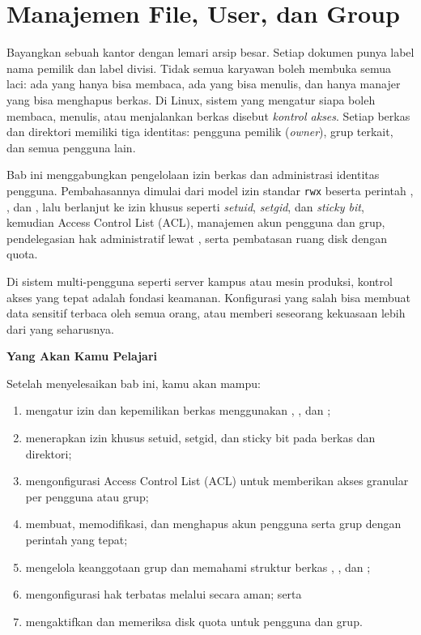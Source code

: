 
\chapter{Manajemen File, User, dan Group}
\label{ch:file-and-user-management}

Bayangkan sebuah kantor dengan lemari arsip besar. Setiap dokumen punya label nama pemilik dan label divisi. Tidak semua karyawan boleh membuka semua laci: ada yang hanya bisa membaca, ada yang bisa menulis, dan hanya manajer yang bisa menghapus berkas. Di Linux, sistem yang mengatur siapa boleh membaca, menulis, atau menjalankan berkas disebut \textit{kontrol akses}. Setiap berkas dan direktori memiliki tiga identitas: pengguna pemilik (\textit{owner}), grup terkait, dan semua pengguna lain.

Bab ini menggabungkan pengelolaan izin berkas dan administrasi identitas pengguna. Pembahasannya dimulai dari model izin standar \texttt{rwx} beserta perintah , , dan , lalu berlanjut ke izin khusus seperti \textit{setuid}, \textit{setgid}, dan \textit{sticky bit}, kemudian Access Control List (ACL), manajemen akun pengguna dan grup, pendelegasian hak administratif lewat , serta pembatasan ruang disk dengan quota.

Di sistem multi-pengguna seperti server kampus atau mesin produksi, kontrol akses yang tepat adalah fondasi keamanan. Konfigurasi yang salah bisa membuat data sensitif terbaca oleh semua orang, atau memberi seseorang kekuasaan lebih dari yang seharusnya.

\textbf{Yang Akan Kamu Pelajari}

Setelah menyelesaikan bab ini, kamu akan mampu:

\begin{enumerate}
    \item mengatur izin dan kepemilikan berkas menggunakan , , dan ;
    \item menerapkan izin khusus setuid, setgid, dan sticky bit pada berkas dan direktori;
    \item mengonfigurasi Access Control List (ACL) untuk memberikan akses granular per pengguna atau grup;
    \item membuat, memodifikasi, dan menghapus akun pengguna serta grup dengan perintah yang tepat;
    \item mengelola keanggotaan grup dan memahami struktur berkas , , dan ;
    \item mengonfigurasi hak  terbatas melalui  secara aman; serta
    \item mengaktifkan dan memeriksa disk quota untuk pengguna dan grup.
\end{enumerate}

